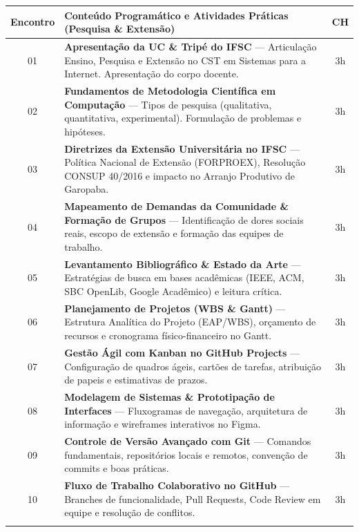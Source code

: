 \documentclass[12pt,a4paper]{article}
\begin{document}
\begin{table}[H]
\centering
\small
\begin{tabularx}{\textwidth}{|c|X|c|}
\hline
\rowcolor{cinzaCabecalho}
\textbf{Encontro} & \textbf{Conteúdo Programático e Atividades Práticas (Pesquisa \& Extensão)} & \textbf{CH} \\ \hline
\rowcolor{cinzaLinha}
01 & \textbf{Apresentação da UC \& Tripé do IFSC} — Articulação Ensino, Pesquisa e Extensão no CST em Sistemas para a Internet. Apresentação do corpo docente. & 3h \\ \hline
02 & \textbf{Fundamentos de Metodologia Científica em Computação} — Tipos de pesquisa (qualitativa, quantitativa, experimental). Formulação de problemas e hipóteses. & 3h \\ \hline
\rowcolor{cinzaLinha}
03 & \textbf{Diretrizes da Extensão Universitária no IFSC} — Política Nacional de Extensão (FORPROEX), Resolução CONSUP 40/2016 e impacto no Arranjo Produtivo de Garopaba. & 3h \\ \hline
04 & \textbf{Mapeamento de Demandas da Comunidade \& Formação de Grupos} — Identificação de dores sociais reais, escopo de extensão e formação das equipes de trabalho. & 3h \\ \hline
\rowcolor{cinzaLinha}
05 & \textbf{Levantamento Bibliográfico \& Estado da Arte} — Estratégias de busca em bases acadêmicas (IEEE, ACM, SBC OpenLib, Google Acadêmico) e leitura crítica. & 3h \\ \hline
06 & \textbf{Planejamento de Projetos (WBS \& Gantt)} — Estrutura Analítica do Projeto (EAP/WBS), orçamento de recursos e cronograma físico-financeiro no Gantt. & 3h \\ \hline
\rowcolor{cinzaLinha}
07 & \textbf{Gestão Ágil com Kanban no GitHub Projects} — Configuração de quadros ágeis, cartões de tarefas, atribuição de papeis e estimativas de prazos. & 3h \\ \hline
08 & \textbf{Modelagem de Sistemas \& Prototipação de Interfaces} — Fluxogramas de navegação, arquitetura de informação e wireframes interativos no Figma. & 3h \\ \hline
\rowcolor{cinzaLinha}
09 & \textbf{Controle de Versão Avançado com Git} — Comandos fundamentais, repositórios locais e remotos, convenção de commits e boas práticas. & 3h \\ \hline
10 & \textbf{Fluxo de Trabalho Colaborativo no GitHub} — Branches de funcionalidade, Pull Requests, Code Review em equipe e resolução de conflitos. & 3h \\ \hline
\rowcolor{cinzaLinha}

\end{tabularx}
\end{table}
\end{document}
